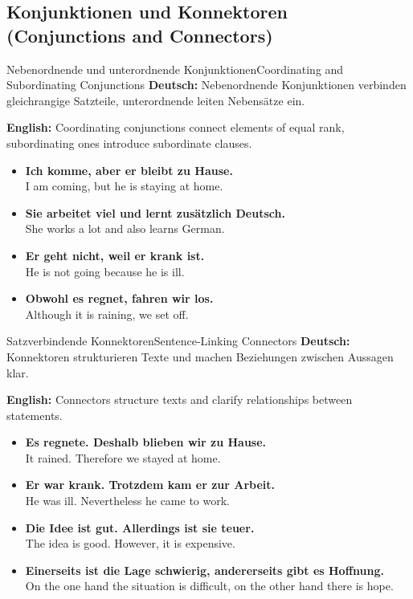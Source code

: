 \documentclass[a4paper,11pt]{article}
\newcommand{\GermanText}[1]{\textbf{Deutsch: }#1\par}
\newcommand{\EnglishText}[1]{{\color{SoftGray}\textbf{English: }#1\par}}
\newcommand{\ExampleItem}[2]{\item \textbf{#1}\\{\color{SoftGray}#2}}
\begin{document}
\subsection{Konjunktionen und Konnektoren {\small (Conjunctions and Connectors)}}

\begin{grammarentry}{Nebenordnende und unterordnende Konjunktionen}{Coordinating and Subordinating Conjunctions}
    \GermanText{Nebenordnende Konjunktionen verbinden gleichrangige Satzteile, unterordnende leiten Nebensätze ein.}
    \EnglishText{Coordinating conjunctions connect elements of equal rank, subordinating ones introduce subordinate clauses.}
    \begin{exbox}
        \begin{itemize}
            \ExampleItem{Ich komme, aber er bleibt zu Hause.}{I am coming, but he is staying at home.}
            \ExampleItem{Sie arbeitet viel und lernt zusätzlich Deutsch.}{She works a lot and also learns German.}
            \ExampleItem{Er geht nicht, weil er krank ist.}{He is not going because he is ill.}
            \ExampleItem{Obwohl es regnet, fahren wir los.}{Although it is raining, we set off.}
        \end{itemize}
    \end{exbox}
\end{grammarentry}

\begin{grammarentry}{Satzverbindende Konnektoren}{Sentence-Linking Connectors}
    \GermanText{Konnektoren strukturieren Texte und machen Beziehungen zwischen Aussagen klar.}
    \EnglishText{Connectors structure texts and clarify relationships between statements.}
    \begin{exbox}
        \begin{itemize}
            \ExampleItem{Es regnete. Deshalb blieben wir zu Hause.}{It rained. Therefore we stayed at home.}
            \ExampleItem{Er war krank. Trotzdem kam er zur Arbeit.}{He was ill. Nevertheless he came to work.}
            \ExampleItem{Die Idee ist gut. Allerdings ist sie teuer.}{The idea is good. However, it is expensive.}
            \ExampleItem{Einerseits ist die Lage schwierig, andererseits gibt es Hoffnung.}{On the one hand the situation is difficult, on the other hand there is hope.}
        \end{itemize}
    \end{exbox}
\end{grammarentry}
\end{document}
